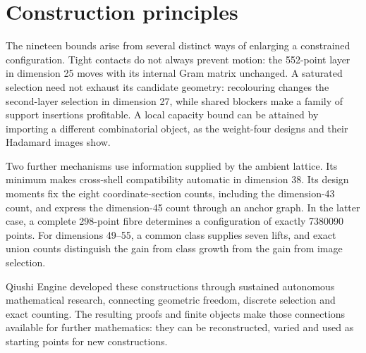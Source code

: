 \section{Construction principles}

The nineteen bounds arise from several distinct ways of enlarging a
constrained configuration. Tight contacts do not always prevent motion:
the 552-point layer in dimension 25 moves with its internal Gram matrix
unchanged. A saturated selection need not exhaust its candidate geometry:
recolouring changes the second-layer selection in dimension 27, while
shared blockers make a family of support insertions profitable. A local
capacity bound can be attained by importing a different combinatorial
object, as the weight-four designs and their Hadamard images show.

Two further mechanisms use information supplied by the ambient lattice.
Its minimum makes cross-shell compatibility automatic in dimension 38.
Its design moments fix the eight coordinate-section counts, including
the dimension-43 count, and express the dimension-45 count through
an anchor graph. In the latter case, a complete 298-point fibre determines
a configuration of exactly 7380090 points. For dimensions
49--55, a common class supplies seven lifts, and exact union counts
distinguish the gain from class growth from the gain from image selection.

Qiushi Engine developed these constructions through sustained autonomous
mathematical research, connecting geometric freedom, discrete selection
and exact counting. The resulting proofs and finite objects make those
connections available for further mathematics: they can be reconstructed,
varied and used as starting points for new constructions.
